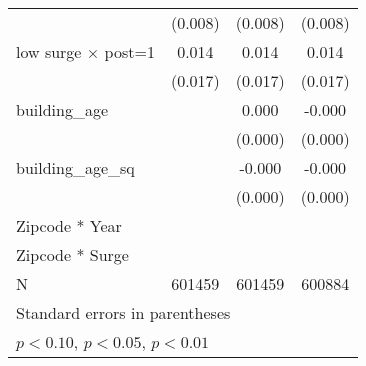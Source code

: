 {\begin{tabular}{l*{3}{c}}
                    &     (0.008)         &     (0.008)         &     (0.008)         \\
\addlinespace
low surge $\times$ post=1&       0.014         &       0.014         &       0.014         \\
                    &     (0.017)         &     (0.017)         &     (0.017)         \\
\addlinespace
building\_age        &                     &       0.000         &      -0.000         \\
                    &                     &     (0.000)         &     (0.000)         \\
\addlinespace
building\_age\_sq     &                     &      -0.000         &      -0.000         \\
                    &                     &     (0.000)         &     (0.000)         \\
\midrule
Zipcode * Year      &                     &                     &                     \\
Zipcode * Surge     &                     &                     &                     \\
N                   &      601459         &      601459         &      600884         \\
\bottomrule
\multicolumn{4}{l}{\footnotesize Standard errors in parentheses}\\
\multicolumn{4}{l}{\footnotesize \sym{*} \(p<0.10\), \sym{**} \(p<0.05\), \sym{***} \(p<0.01\)}\\
\end{tabular}
}
